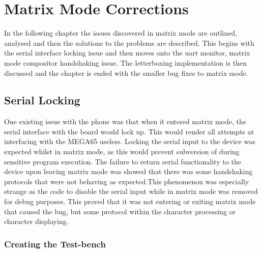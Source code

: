 
\chapter{Matrix Mode Corrections} %

\label{Chapter 5} %

In the following chapter the issues discovered in matrix mode are outlined, analysed and then the solutions to the problems are described. This begins with the serial interface locking issue and then moves onto the uart monitor, matrix mode compositor handshaking issue. The letterboxing implementation is then discussed and the chapter is ended with the smaller bug fixes to matrix mode.


\section{Serial Locking}

\label{Ch5 Sec1}

One existing issue with the phone was that when it entered matrix mode, the serial interface with the board would lock up. This would render all attempts at interfacing with the MEGA65 useless. Locking the serial input to the device was expected whilst in matrix mode, as this would prevent subversion of during sensitive program execution. The failure to return serial functionality to the device upon leaving matrix mode was showed that there was some handshaking protocols that were not behaving as expected.This phenomenon was especially strange as the code to disable the serial input while in matrix mode was removed for debug purposes. This proved that it was not entering or exiting matrix mode that caused the bug, but some protocol within the character processing or character displaying.

\subsection{Creating the Test-bench}

\label{Ch5 Sec1 Sub1}

